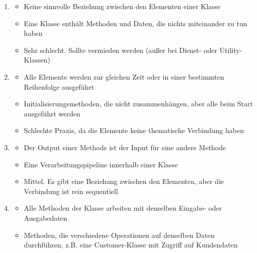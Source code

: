 \begin{infoBox}[title=Typen von Kohäsion (nach Qualität geordnet)]
    \begin{enumerate}
        \item {}
        \begin{itemize}
            \item {} Keine sinnvolle Beziehung zwischen den Elementen einer Klasse
            \item {} Eine Klasse enthält Methoden und Daten, die nichts miteinander zu tun haben
            \item {} Sehr schlecht. Sollte vermieden werden (außer bei Dienst- oder Utility-Klassen)
        \end{itemize}
        \item {}
        \begin{itemize}
            \item {} Alle Elemente werden zur gleichen Zeit oder in einer bestimmten Reihenfolge ausgeführt
            \item {} Initialisierungsmethoden, die nicht zusammenhängen, aber alle beim Start ausgeführt werden
            \item {} Schlechte Praxis, da die Elemente keine thematische Verbindung haben
        \end{itemize}
        \item {}
        \begin{itemize}
            \item {} Der Output einer Methode ist der Input für eine andere Methode
            \item {} Eine Verarbeitungspipeline innerhalb einer Klasse
            \item {} Mittel. Es gibt eine Beziehung zwischen den Elementen, aber die Verbindung ist rein sequentiell
        \end{itemize}
        \item {}
        \begin{itemize}
            \item {} Alle Methoden der Klasse arbeiten mit denselben Eingabe- oder Ausgabedaten
            \item {} Methoden, die verschiedene Operationen auf denselben Daten durchführen, z.B. eine Customer-Klasse mit Zugriff auf Kundendaten

\end{itemize}
\end{enumerate}
\end{infoBox}
